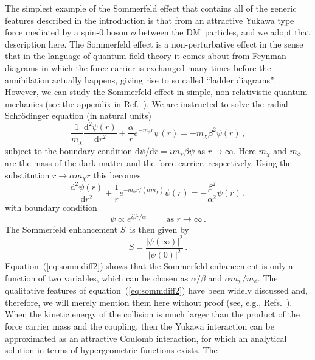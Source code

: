 \documentclass[aps,prd,twocolumn,amsmath,amssymb,floatfix,nofootinbib,10pt]{revtex4}
\newcommand{\eg}{e.g.}
\newcommand{\DM}{DM}
\newcommand{\somm}{\ensuremath{S}}
\newcommand{\mdm}{\ensuremath{m_{\chi}}}
\newcommand{\mv}{\ensuremath{m_{\phi}}}
\newcommand{\dd}{\mathrm{d}}
\newcommand{\Eqnname}{Equation}
\newcommand{\eqnname}{equation}
\begin{document}
The simplest example of the Sommerfeld effect that contains all of the
generic features described in the introduction is that from an
attractive Yukawa type force mediated by a spin-0 boson $\phi$ between
the \DM\ particles, and we adopt that description here. The Sommerfeld
effect is a non-perturbative effect in the sense that in the language
of quantum field theory it comes about from Feynman diagrams in which
the force carrier is exchanged many times before the annihilation
actually happens, giving rise to so called ``ladder
diagrams''. However, we can study the Sommerfeld effect in simple,
non-relativistic quantum mechanics (see the appendix in
Ref.~\cite{ArkaniHamed:2008qn}). We are instructed to solve the radial
Schr{\"o}dinger equation (in natural units)
\begin{equation}\label{eq:sommdiff1}
\frac{1}{\mdm} \frac{\dd^2 \psi(r)}{\dd r^2} + \frac{\alpha}{r}e^{-\mv r} \psi(r) = -\mdm \beta^2 \psi(r)\, ,
\end{equation}
subject to the boundary condition $\dd\psi/\dd r = i \mdm \beta \psi$
as $r \rightarrow \infty$. Here $\mdm$ and $\mv$ are the mass of the
dark matter and the force carrier, respectively. Using the
substitution $r \rightarrow \alpha \mdm r$ this becomes
\begin{equation}\label{eq:sommdiff2}
\frac{\dd^2 \psi(r)}{\dd r^2} + \frac{1}{r}e^{-\mv r/(\alpha \mdm)} \psi(r) = -\frac{\beta^2}{\alpha^2} \psi(r)\, ,
\end{equation}
with boundary condition
\begin{equation}
\psi \propto e^{i\beta r/\alpha} \qquad \mbox{ as } r \rightarrow\infty\, .
\end{equation}
The Sommerfeld enhancement \somm\ is then given by
\begin{equation}
\somm = \frac{|\psi(\infty)|^2}{|\psi(0)|^2}\, .
\end{equation}
\Eqnname~(\ref{eq:sommdiff2}) shows that the Sommerfeld enhancement is
only a function of two variables, which can be chosen as
$\alpha/\beta$ and $\alpha \mdm/\mv$. The qualitative features of
\eqnname\ (\ref{eq:sommdiff2}) have been widely discussed and,
therefore, we will merely mention them here without proof (see, \eg,
Refs.~\cite{ArkaniHamed:2008qn,2008arXiv0812.0360L}). When the kinetic
energy of the collision is much larger than the product of the force
carrier mass and the coupling, then the Yukawa interaction can be
approximated as an attractive Coulomb interaction, for which an
analytical solution in terms of hypergeometric functions exists. The
\end{document}
